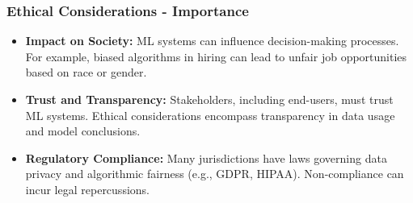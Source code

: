 \documentclass{beamer}
\begin{document}
\begin{frame}[fragile]
    \frametitle{Ethical Considerations - Importance}
    \begin{itemize}
        \item \textbf{Impact on Society:} ML systems can influence decision-making processes. For example, biased algorithms in hiring can lead to unfair job opportunities based on race or gender.
        \item \textbf{Trust and Transparency:} Stakeholders, including end-users, must trust ML systems. Ethical considerations encompass transparency in data usage and model conclusions.
        \item \textbf{Regulatory Compliance:} Many jurisdictions have laws governing data privacy and algorithmic fairness (e.g., GDPR, HIPAA). Non-compliance can incur legal repercussions.
    \end{itemize}
\end{frame}
\end{document}
